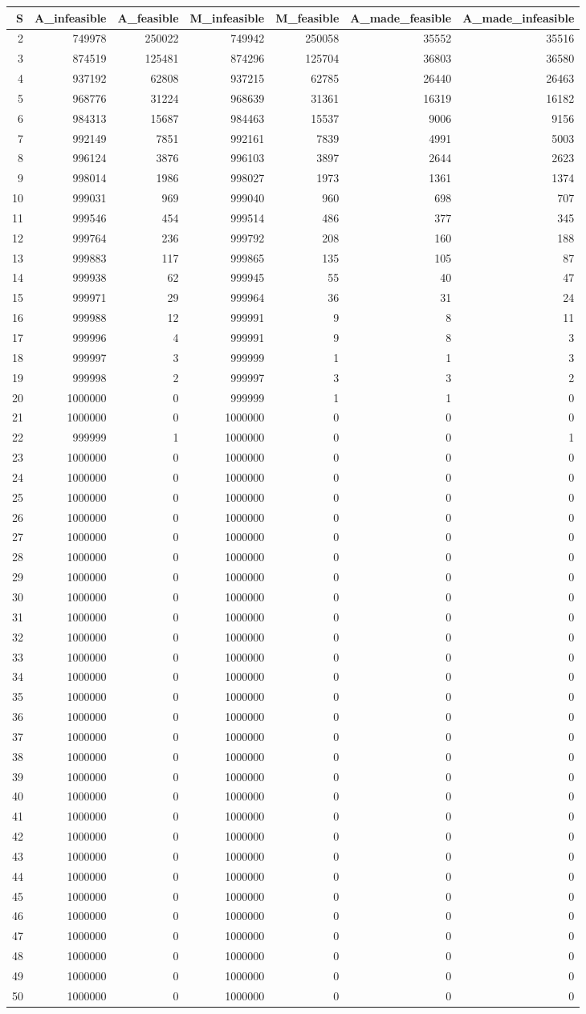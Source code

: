 \documentclass[]{article}
\begin{document}
\begin{longtable}[]{@{}rrrrrrr@{}}
\toprule
S & A\_infeasible & A\_feasible & M\_infeasible & M\_feasible &
A\_made\_feasible & A\_made\_infeasible\tabularnewline
\midrule
\endhead
2 & 749978 & 250022 & 749942 & 250058 & 35552 & 35516\tabularnewline
3 & 874519 & 125481 & 874296 & 125704 & 36803 & 36580\tabularnewline
4 & 937192 & 62808 & 937215 & 62785 & 26440 & 26463\tabularnewline
5 & 968776 & 31224 & 968639 & 31361 & 16319 & 16182\tabularnewline
6 & 984313 & 15687 & 984463 & 15537 & 9006 & 9156\tabularnewline
7 & 992149 & 7851 & 992161 & 7839 & 4991 & 5003\tabularnewline
8 & 996124 & 3876 & 996103 & 3897 & 2644 & 2623\tabularnewline
9 & 998014 & 1986 & 998027 & 1973 & 1361 & 1374\tabularnewline
10 & 999031 & 969 & 999040 & 960 & 698 & 707\tabularnewline
11 & 999546 & 454 & 999514 & 486 & 377 & 345\tabularnewline
12 & 999764 & 236 & 999792 & 208 & 160 & 188\tabularnewline
13 & 999883 & 117 & 999865 & 135 & 105 & 87\tabularnewline
14 & 999938 & 62 & 999945 & 55 & 40 & 47\tabularnewline
15 & 999971 & 29 & 999964 & 36 & 31 & 24\tabularnewline
16 & 999988 & 12 & 999991 & 9 & 8 & 11\tabularnewline
17 & 999996 & 4 & 999991 & 9 & 8 & 3\tabularnewline
18 & 999997 & 3 & 999999 & 1 & 1 & 3\tabularnewline
19 & 999998 & 2 & 999997 & 3 & 3 & 2\tabularnewline
20 & 1000000 & 0 & 999999 & 1 & 1 & 0\tabularnewline
21 & 1000000 & 0 & 1000000 & 0 & 0 & 0\tabularnewline
22 & 999999 & 1 & 1000000 & 0 & 0 & 1\tabularnewline
23 & 1000000 & 0 & 1000000 & 0 & 0 & 0\tabularnewline
24 & 1000000 & 0 & 1000000 & 0 & 0 & 0\tabularnewline
25 & 1000000 & 0 & 1000000 & 0 & 0 & 0\tabularnewline
26 & 1000000 & 0 & 1000000 & 0 & 0 & 0\tabularnewline
27 & 1000000 & 0 & 1000000 & 0 & 0 & 0\tabularnewline
28 & 1000000 & 0 & 1000000 & 0 & 0 & 0\tabularnewline
29 & 1000000 & 0 & 1000000 & 0 & 0 & 0\tabularnewline
30 & 1000000 & 0 & 1000000 & 0 & 0 & 0\tabularnewline
31 & 1000000 & 0 & 1000000 & 0 & 0 & 0\tabularnewline
32 & 1000000 & 0 & 1000000 & 0 & 0 & 0\tabularnewline
33 & 1000000 & 0 & 1000000 & 0 & 0 & 0\tabularnewline
34 & 1000000 & 0 & 1000000 & 0 & 0 & 0\tabularnewline
35 & 1000000 & 0 & 1000000 & 0 & 0 & 0\tabularnewline
36 & 1000000 & 0 & 1000000 & 0 & 0 & 0\tabularnewline
37 & 1000000 & 0 & 1000000 & 0 & 0 & 0\tabularnewline
38 & 1000000 & 0 & 1000000 & 0 & 0 & 0\tabularnewline
39 & 1000000 & 0 & 1000000 & 0 & 0 & 0\tabularnewline
40 & 1000000 & 0 & 1000000 & 0 & 0 & 0\tabularnewline
41 & 1000000 & 0 & 1000000 & 0 & 0 & 0\tabularnewline
42 & 1000000 & 0 & 1000000 & 0 & 0 & 0\tabularnewline
43 & 1000000 & 0 & 1000000 & 0 & 0 & 0\tabularnewline
44 & 1000000 & 0 & 1000000 & 0 & 0 & 0\tabularnewline
45 & 1000000 & 0 & 1000000 & 0 & 0 & 0\tabularnewline
46 & 1000000 & 0 & 1000000 & 0 & 0 & 0\tabularnewline
47 & 1000000 & 0 & 1000000 & 0 & 0 & 0\tabularnewline
48 & 1000000 & 0 & 1000000 & 0 & 0 & 0\tabularnewline
49 & 1000000 & 0 & 1000000 & 0 & 0 & 0\tabularnewline
50 & 1000000 & 0 & 1000000 & 0 & 0 & 0\tabularnewline
\bottomrule
\end{longtable}
\end{document}
